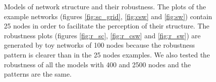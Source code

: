 \begin{landscape}
\begin{figure}[p]
\caption[Models of network structure and their robustness.]{Models of network structure and their robustness. The plots of the example networks (figures \ref{fig:sc_grid}, \ref{fig:csw} and \ref{fig:sw}) contain 25 nodes in order to facilitate the perception of their structure. The robustness plots (figures \ref{fig:r_sc}, \ref{fig:r_csw} and \ref{fig:r_sw}) are generated by toy networks of 100 nodes because the robustness pattern is clearer than in the 25 nodes examples. We also tested the robustness of all the models with 400 and 2500 nodes and the patterns are the same.}
\label{fig:models}
\end{figure}
\end{landscape}


